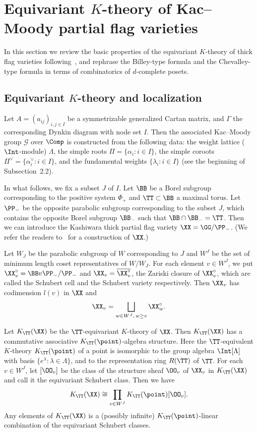 \section{%
Equivariant \texorpdfstring{$K$}{K}-theory of Kac--Moody partial flag varieties
}\label{sect4}

In this section we review the basic properties of the equivariant $K$-theory 
of thick flag varieties following~\cite[Section~3]{LSS}, 
and rephrase the Billey-type formula and the Chevalley-type formula 
in terms of combinatorics of $d$-complete posets.

\subsection{Equivariant \texorpdfstring{$K$}{K}-theory and localization}\label{subsec4.1}

Let $A = (a_{ij})_{i,j \in I}$ be a symmetrizable generalized Cartan matrix, 
and $\Gamma$ the corresponding Dynkin diagram with node set $I$.
Then the associated Kac--Moody group $\mathcal{G}$ over $\Comp$ is constructed from the following data:
the weight lattice ($\Int$-module) $\Lambda$, the simple roots $\Pi = \{ \alpha_i : i \in I \}$, 
the simple coroots $\Pi^\vee = \{ \alpha^\vee_i :i \in I \}$, 
and the fundamental weights $\{ \lambda_i : i \in I \}$ (see the beginning of Subsection~2.2).

In what follows, we fix a subset $J$ of $I$.
Let $\BB$ be a Borel subgroup corresponding to the positive system $\Phi_+$ 
and $\TT \subset \BB$ a maximal torus.
Let $\PP_-$ be the opposite parabolic subgroup corresponding to the subset $J$, 
which contains the opposite Borel subgroup $\BB_-$ such that $\BB \cap \BB_- = \TT$.
Then we can introduce the Kashiwara thick partial flag variety $\XX = \GG/\PP_-$.
(We refer the readers to~\cite{Ka} for a construction of $\XX$.)

Let $W_J$ be the parabolic subgroup of $W$ corresponding to $J$ 
and $W^J$ be the set of minimum length coset representatives of $W/W_J$.
For each element $v \in W^J$, we put $\XX^\circ_v = \BB v \PP_-/\PP_-$ 
and $\XX_v = \overline{\XX^\circ_v}$, the Zariski closure of $\XX^\circ_v$, 
which are called the Schubert cell and the Schubert variety respectively.
Then $\XX_v$ has codimension $l(v)$ in $\XX$ and
$$
\XX_v = \bigsqcup_{w \in W^J, \, w \ge v} \XX^\circ_w.
$$

Let $K_\TT(\XX)$ be the $\TT$-equivariant $K$-theory of $\XX$.
Then $K_\TT(\XX)$ has a commutative associative $K_\TT(\point)$-algebra structure.
Here the $\TT$-equivalent $K$-theory $K_\TT(\point)$ of a point is isomorphic 
to the group algebra $\Int[\Lambda]$ with basis $\{ e^\lambda : \lambda \in \Lambda \}$, 
and to the representation ring $R(\TT)$ of $\TT$.
For each $v \in W^J$, let $[\OO_v]$ be the class of the structure sheaf $\OO_v$ of $\XX_v$ 
in $K_\TT(\XX)$ and call it the equivariant Schubert class.
Then we have
$$
K_\TT(\XX) \cong \prod_{v \in W^J} K_\TT(\point) [\OO_v].
$$
Any elements of $K_\TT(\XX)$ is a (possibly infinite) $K_\TT(\point)$-linear combination 
of the equivariant Schubert classes.


